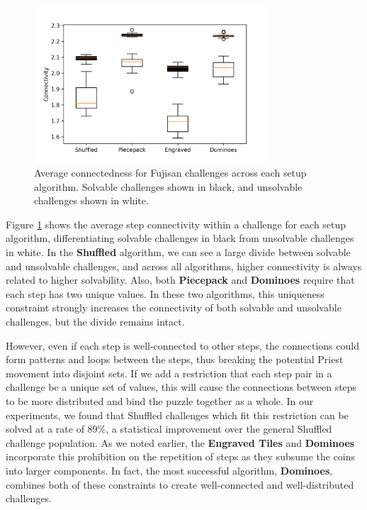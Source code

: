 \documentclass[journal]{IEEEtran}
\begin{document}
\begin{figure}[t]
\includegraphics[width=8.8cm]{figure19.png}
\caption{Average connectedness for Fujisan challenges across each setup algorithm. 
Solvable challenges shown in black, and unsolvable challenges shown in white.}
\label{fig:connected}
\end{figure}



Figure \ref{fig:connected} shows the average step connectivity within a challenge for each setup algorithm, differentiating solvable challenges in black from unsolvable challenges in white. 
In the \textbf{Shuffled} algorithm, we can see a large divide between solvable and unsolvable challenges, and across all algorithms, higher connectivity is always related to higher solvability. Also, both \textbf{Piecepack} and \textbf{Dominoes} require that each step has two unique values. In these two algorithms, this uniqueness constraint strongly increases the connectivity of both solvable and unsolvable challenges, but the divide remains intact.

However, even if each step is well-connected to other steps, the connections could form patterns and loops between the steps, thus breaking the potential Priest movement into disjoint sets. If we add a restriction that each step pair in a challenge be a unique set of values, this will cause the connections between steps to be more distributed and bind the puzzle together as a whole. In our experiments, we found that Shuffled challenges which fit this restriction can be solved at a rate of 89\%, a statistical improvement over the general Shuffled challenge population. As we noted earlier, the {\bf Engraved Tiles} and {\bf Dominoes} incorporate this prohibition on the repetition of steps as they subsume the coins into larger components. In fact, the most successful algorithm, {\bf Dominoes}, combines both of these constraints to create well-connected and well-distributed challenges.
\end{document}
